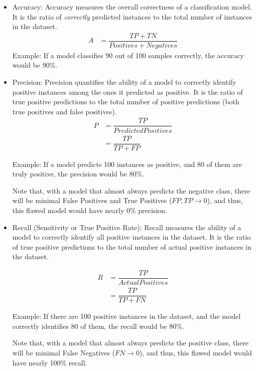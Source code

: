 \begin{itemize}
    \item Accuracy: Accuracy measures the overall correctness of a classification model. It is the ratio of \emph{correctly} predicted instances to the total number of instances in the dataset.\\
    \begin{align}
    A &= \dfrac{TP + TN}{Positives + Negatives}  \label{eq:def_accuarcy}
\end{align}
    Example: If a model classifies 90 out of 100 samples correctly, the accuracy would be 90\%.
    
    \item Precision: Precision quantifies the ability of a model to correctly identify positive instances among the ones it predicted as positive. It is the ratio of true positive predictions to the total number of positive predictions (both true positives and false positives).
    \begin{align}
    P &= \dfrac{TP}{Predicted Positives} \\
        &=\dfrac{TP}{TP + FP}  \label{eq:def_precision}
    \end{align}
    
    Example: If a model predicts 100 instances as positive, and 80 of them are truly positive, the precision would be 80\%. 
    
    Note that, with a model that almost always predicts the negative class, there will be minimal False Positives and True Positives ($FP, TP \to 0$), and thus, this flawed model would have nearly 0\% precision.

    \item Recall (Sensitivity or True Positive Rate): Recall measures the ability of a model to correctly identify all positive instances in the dataset. It is the ratio of true positive predictions to the total number of actual positive instances in the dataset. 

    \begin{align}
    R   &= \dfrac{TP}{Actual Positives} \\
        &= \dfrac{TP}{TP + FN} \label{eq:def_recall}
    \end{align}

    Example: If there are 100 positive instances in the dataset, and the model correctly identifies 80 of them, the recall would be 80\%.

    Note that, with a model that almost always predicts the positive class, there will be minimal False Negatives ($FN \to 0$), and thus, this flawed model would have nearly 100\% recall.


\end{itemize}
